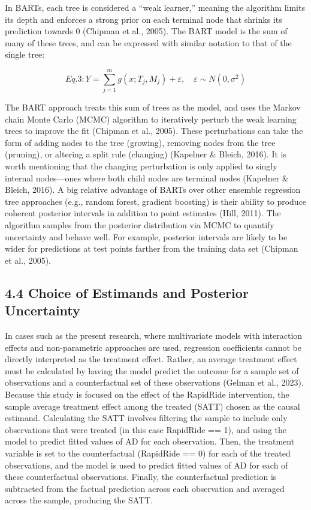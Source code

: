 \documentclass[
  12pt,
]{article}
\begin{document}
In BARTs, each tree is considered a ``weak learner,'' meaning the
algorithm limits its depth and enforces a strong prior on each terminal
node that shrinks its prediction towards \(0\) (Chipman et al., 2005).
The BART model is the sum of many of these trees, and can be expressed
with similar notation to that of the single tree:

\[Eq. 3: Y = \sum_{j=1}^{m} g(x; T_j, M_j) + \varepsilon, \quad \varepsilon \sim N(0, \sigma^2)\]

The BART approach treats this sum of trees as the model, and uses the
Markov chain Monte Carlo (MCMC) algorithm to iteratively perturb the
weak learning trees to improve the fit (Chipman et al., 2005). These
perturbations can take the form of adding nodes to the tree (growing),
removing nodes from the tree (pruning), or altering a split rule
(changing) (Kapelner \& Bleich, 2016). It is worth mentioning that the
changing perturbation is only applied to singly internal nodes---ones
where both child nodes are terminal nodes (Kapelner \& Bleich, 2016). A
big relative advantage of BARTs over other ensemble regression tree
approaches (e.g., random forest, gradient boosting) is their ability to
produce coherent posterior intervals in addition to point estimates
(Hill, 2011). The algorithm samples from the posterior distribution via
MCMC to quantify uncertainty and behave well. For example, posterior
intervals are likely to be wider for predictions at test points farther
from the training data set (Chipman et al., 2005).

\subsection{4.4 Choice of Estimands and Posterior
Uncertainty}\label{choice-of-estimands-and-posterior-uncertainty}

In cases such as the present research, where multivariate models with
interaction effects and non-parametric approaches are used, regression
coefficients cannot be directly interpreted as the treatment effect.
Rather, an average treatment effect must be calculated by having the
model predict the outcome for a sample set of observations and a
counterfactual set of these observations (Gelman et al., 2023). Because
this study is focused on the effect of the RapidRide intervention, the
sample average treatment effect among the treated (SATT) chosen as the
causal estimand. Calculating the SATT involves filtering the sample to
include only observations that were treated (in this case RapidRide ==
1), and using the model to predict fitted values of AD for each
observation. Then, the treatment variable is set to the counterfactual
(RapidRide == 0) for each of the treated observations, and the model is
used to predict fitted values of AD for each of these counterfactual
observations. Finally, the counterfactual prediction is subtracted from
the factual prediction across each observation and averaged across the
sample, producing the SATT.
\end{document}
